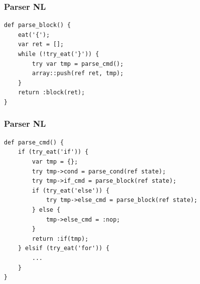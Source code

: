 \documentclass{beamer}
\begin{document}
	\begin{frame}[fragile]
		\frametitle{Parser NL}
		\begin{lstlisting}[language=nl]
def parse_block() {
	eat('{');
	var ret = [];
	while (!try_eat('}')) {
		try var tmp = parse_cmd();
		array::push(ref ret, tmp);
	}
	return :block(ret);
}
		\end{lstlisting}
	\end{frame}
	
	\begin{frame}[fragile]
		\frametitle{Parser NL}
		\begin{lstlisting}[language=nl]
def parse_cmd() {
	if (try_eat('if')) {
		var tmp = {};
		try tmp->cond = parse_cond(ref state);
		try tmp->if_cmd = parse_block(ref state);
		if (try_eat('else')) {
			try tmp->else_cmd = parse_block(ref state);
		} else {
			tmp->else_cmd = :nop;
		}
		return :if(tmp);
	} elsif (try_eat('for')) {
		...
	}
}
		\end{lstlisting}
	\end{frame}
\end{document}
